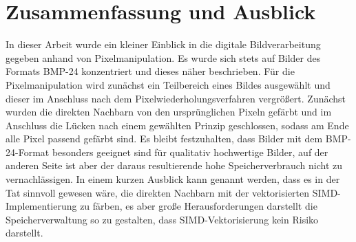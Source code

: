 \documentclass[course=erap]{aspdoc}
\begin{document}
\section{Zusammenfassung und Ausblick}

In dieser Arbeit wurde ein kleiner Einblick in die digitale Bildverarbeitung gegeben anhand von Pixelmanipulation. Es wurde sich stets auf Bilder des Formats BMP-24 konzentriert und dieses näher beschrieben. Für die Pixelmanipulation wird zunächst ein Teilbereich eines Bildes ausgewählt und dieser im Anschluss nach dem Pixelwiederholungsverfahren vergrößert. Zunächst wurden die direkten Nachbarn von den ursprünglichen Pixeln gefärbt und im Anschluss die Lücken nach einem gewählten Prinzip geschlossen, sodass am Ende alle Pixel passend gefärbt sind. 
Es bleibt festzuhalten, dass Bilder mit dem BMP-24-Format besonders geeignet sind für qualitativ hochwertige Bilder, auf der anderen Seite ist aber der daraus resultierende hohe Speicherverbrauch nicht zu vernachlässigen. In einem kurzen Ausblick kann genannt werden, dass es in der Tat sinnvoll gewesen wäre, die direkten Nachbarn mit der vektorisierten SIMD-Implementierung zu färben, es aber große Herausforderungen darstellt die Speicherverwaltung so zu gestalten, dass SIMD-Vektorisierung kein Risiko darstellt. 


{}
\end{document}

